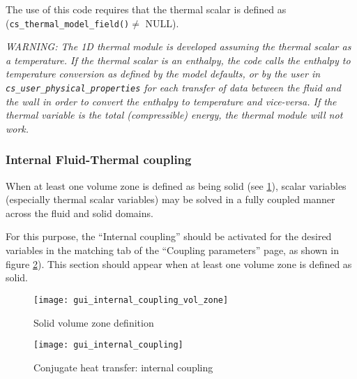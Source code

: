 The use of this code requires that the thermal scalar is
defined as (\texttt{cs\_thermal\_model\_field()}$\ne$ NULL).

{\em WARNING: The 1D thermal module is developed assuming the thermal scalar
 as a temperature. If the thermal scalar is an enthalpy, the code calls the
 enthalpy to temperature conversion as defined by the model defaults,
 or by the user in \texttt{cs\_user\_physical\_properties} for each
 transfer of data between the fluid and the wall in order to convert the
 enthalpy to temperature and vice-versa. If the thermal
 variable is the total (compressible) energy, the thermal module will not work.}

\subsubsection{Internal Fluid-Thermal coupling}

When at least one volume zone is defined as being solid
(see \figurename\ref{fig:internal_coupling_vol_solid}), scalar variables (especially
thermal scalar variables) may be solved in a fully coupled manner across the fluid
and solid domains.

For this purpose, the ``Internal coupling'' should be activated for the desired variables
in the matching tab of the ``Coupling parameters'' page, as shown in figure
\figurename\ref{fig:internal_coupling_param}). This section should appear when
at least one volume zone is defined as solid.

\begin{figure}[ht]
\begin{center}
\texttt{[image: gui\_internal\_coupling\_vol\_zone]}
\caption{Solid volume zone definition}
\label{fig:internal_coupling_vol_solid}
\end{center}
\end{figure}

\begin{figure}[ht]
\begin{center}
\texttt{[image: gui\_internal\_coupling]}
\caption{Conjugate heat transfer: internal coupling}
\label{fig:internal_coupling_param}
\end{center}
\end{figure}

